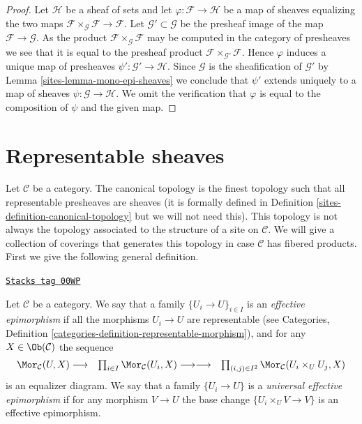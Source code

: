 \begin{proof}

Let $\mathcal{H}$ be a sheaf of sets and let
$\varphi : \mathcal{F} \to \mathcal{H}$ be a map of sheaves equalizing
the two maps $\mathcal{F} \times_\mathcal{G} \mathcal{F} \to \mathcal{F}$.
Let $\mathcal{G}' \subset \mathcal{G}$ be the presheaf image of
the map $\mathcal{F} \to \mathcal{G}$. As the product
$\mathcal{F} \times_\mathcal{G} \mathcal{F}$ may be computed in the
category of presheaves we see that it is equal to the presheaf product
$\mathcal{F} \times_{\mathcal{G}'} \mathcal{F}$. Hence $\varphi$
induces a unique map of presheaves $\psi' : \mathcal{G}' \to \mathcal{H}$.
Since $\mathcal{G}$ is the sheafification of $\mathcal{G}'$ by
Lemma \ref{sites-lemma-mono-epi-sheaves}
we conclude that $\psi'$ extends uniquely to a map of sheaves
$\psi : \mathcal{G} \to \mathcal{H}$. We omit the verification that
$\varphi$ is equal to the composition of $\psi$ and the given map.
\end{proof}

\section{Representable sheaves}
\label{sites-section-representable-sheaves}
Let $\mathcal{C}$ be a category. The canonical topology is
the finest topology such that all representable presheaves
are sheaves (it is formally defined in
Definition \ref{sites-definition-canonical-topology} but we will not
need this).
This topology is not always the topology associated to the
structure of a site on $\mathcal{C}$.
We will give a collection of coverings that generates this topology
in case $\mathcal{C}$ has fibered products. First we give
the following general definition.

\begin{definition}
\label{sites-definition-universal-effective-epimorphisms}
\href{https://stacks.math.columbia.edu/tag/00WP}{\texttt{Stacks tag 00WP}}

Let $\mathcal{C}$ be a category. We say that a family $\{U_i \to U\}_{i \in I}$
is an {\it effective epimorphism} if all the morphisms $U_i \to U$ are
representable (see
Categories, Definition \ref{categories-definition-representable-morphism}),
and for any $X\in \Ob(\mathcal{C})$ the sequence
$$
\begin{array}{ccc}\Mor_\mathcal{C}(U, X) \longrightarrow & \prod\nolimits_{i \in I} \Mor_\mathcal{C}(U_i, X)
\longrightarrow\longrightarrow & \prod\nolimits_{(i, j) \in I^2} \Mor_\mathcal{C}(U_i \times_U U_j, X)\end{array}
$$
is an equalizer diagram. We say that a family $\{U_i \to U\}$ is a
{\it universal effective epimorphism} if for any morphism $V \to U$
the base change $\{U_i \times_U V \to V\}$ is an effective epimorphism.
\end{definition}

